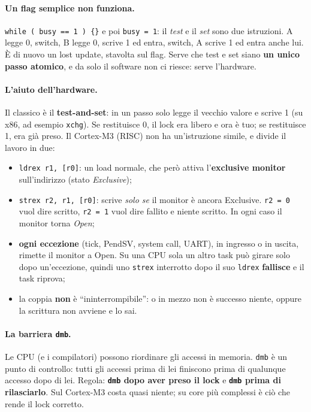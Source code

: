 \paragraph*{Un flag semplice non funziona.} \texttt{while ( busy == 1 ) \{\}} e poi \texttt{busy = 1}: il \emph{test} e il \emph{set} sono due istruzioni. A legge 0, switch, B legge 0, scrive 1 ed entra, switch, A scrive 1 ed entra anche lui. È di nuovo un lost update, stavolta sul flag. Serve che test e set siano \textbf{un unico passo atomico}, e da solo il software non ci riesce: serve l'hardware.

\paragraph*{L'aiuto dell'hardware.} Il classico è il \textbf{test-and-set}: in un passo solo legge il vecchio valore e scrive 1 (su x86, ad esempio \texttt{xchg}). Se restituisce 0, il lock era libero e ora è tuo; se restituisce 1, era già preso. Il Cortex-M3 (RISC) non ha un'istruzione simile, e divide il lavoro in due:
\begin{itemize}
    \item \texttt{ldrex r1, [r0]}: un load normale, che però attiva l'\textbf{exclusive monitor} sull'indirizzo (stato \emph{Exclusive});
    \item \texttt{strex r2, r1, [r0]}: scrive \emph{solo se} il monitor è ancora Exclusive. \texttt{r2 = 0} vuol dire scritto, \texttt{r2 = 1} vuol dire fallito e niente scritto. In ogni caso il monitor torna \emph{Open};
    \item \textbf{ogni eccezione} (tick, PendSV, system call, UART), in ingresso o in uscita, rimette il monitor a Open. Su una CPU sola un altro task può girare solo dopo un'eccezione, quindi uno \texttt{strex} interrotto dopo il suo \texttt{ldrex} \textbf{fallisce} e il task riprova;
    \item la coppia \textbf{non} è ``ininterrompibile'': o in mezzo non è successo niente, oppure la scrittura non avviene e lo sai.
\end{itemize}

\paragraph*{La barriera \texttt{dmb}.} Le CPU (e i compilatori) possono riordinare gli accessi in memoria. \texttt{dmb} è un punto di controllo: tutti gli accessi prima di lei finiscono prima di qualunque accesso dopo di lei. Regola: \textbf{\texttt{dmb} dopo aver preso il lock} e \textbf{\texttt{dmb} prima di rilasciarlo}. Sul Cortex-M3 costa quasi niente; su core più complessi è ciò che rende il lock corretto.

